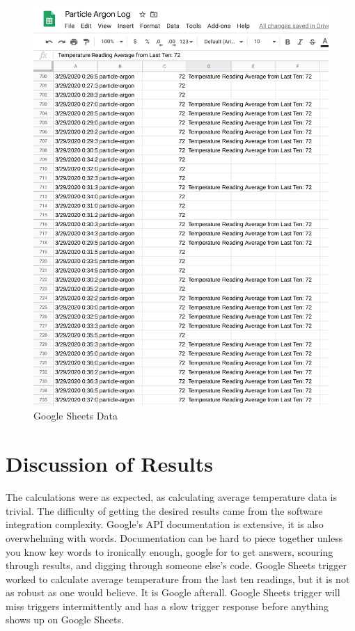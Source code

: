 \documentclass{article}
\begin{document}
\begin{figure}[H]
\center
\includegraphics[width=\textwidth]{images/particle-argon-gcp-sheets.png}
\caption{Google Sheets Data}
\label{fig:sheets}
\end{figure}

\section{Discussion of Results}
The calculations were as expected, as calculating average temperature data is trivial. The difficulty of getting the desired results came from the software integration complexity. Google's API documentation is extensive, it is also overwhelming with words. Documentation can be hard to piece together unless you know key words to ironically enough, google for to get answers, scouring through results, and digging through someone else's code. Google Sheets trigger worked to calculate average temperature from the last ten readings, but it is not as robust as one would believe. It is Google afterall. Google Sheets trigger will miss triggers intermittently and has a slow trigger response before anything shows up on Google Sheets.
\end{document}
